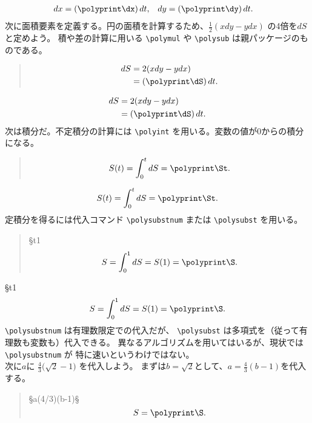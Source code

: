 \documentclass[dvipdfmx]{jsarticle}\usepackage[moga-mobo]{pxchfon}
\begin{document}
\begin{align*}
  dx &= (\polyprint\dx)\,dt, & dy &= (\polyprint\dy)\,dt.
\end{align*}    
次に面積要素を定義する。円の面積を計算するため、$\frac12(xdy-ydx)$ の4倍を$dS$と定めよう。
積や差の計算に用いる \verb|\polymul| や \verb|\polysub| は親パッケージのものである。
\begin{quote}
\begin{boxedverbatim}
\polymul\dSA\x\dy  \polymul\dSB\y\dx
\polysub\dS\dSA\dSB \polymul{}\dS
\begin{align*}
 dS &=2(xdy-ydx)\\
    &=(\polyprint\dS)\,dt.
\end{align*}
\end{boxedverbatim}
\end{quote}
\polymul\dSA\x\dy  \polymul\dSB\y\dx
\polysub\dS\dSA\dSB  \polymul{}\dS
\begin{align*}
 dS &=2(xdy-ydx)\\
    &=(\polyprint\dS)\,dt.
\end{align*}
次は積分だ。不定積分の計算には \verb|\polyint| を用いる。変数の値が0からの積分になる。
\begin{quote}
\begin{boxedverbatim}
\polyint{}\dS
\[ S(t) = \int_0^tdS = \polyprint\St. \]
\end{boxedverbatim}
\end{quote}
\polyint{}\dS
\[ S(t) = \int_0^tdS = \polyprint\St. \]
定積分を得るには代入コマンド \verb|\polysubstnum| または  \verb|\polysubst| を用いる。
\begin{quote}
\begin{boxedverbatim}
\polysubstnum\S{t}{1}\St
\[ S = \int_0^1dS = S(1) = \polyprint\S. \]
\end{boxedverbatim}
\end{quote}
\polysubstnum\S{t}{1}\St
\[ S = \int_0^1dS = S(1) = \polyprint\S. \]
\verb|\polysubstnum| は有理数限定での代入だが、
\verb|\polysubst| は多項式を（従って有理数も変数も）代入できる。
異なるアルゴリズムを用いてはいるが、現状では \verb|\polysubstnum| が
特に速いというわけではない。
\medskip\\
次に$a$に $\frac43\bigl(\sqrt2-1\bigr)$ を代入しよう。
まずは$b=\sqrt2$として、$a=\frac43(b-1)$を代入する。
\begin{quote}
\begin{boxedverbatim}
\polysubst\S{a}{(4/3)(b-1)}\S
\[ S=\polyprint\S. \]
\end{boxedverbatim}
\end{quote}
\end{document}
